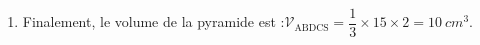 \documentclass[10pt]{article}
\providecommand{\np}[2][]{{#2~#1}}
\begin{document}
\begin{enumerate}
\begin{enumerate}
	L'aire du trapèze ABDC est donc :\quad $\mathcal{A}_{\mathrm{ABDC}} = \dfrac{\sqrt{2} + 4\sqrt{2}}{2}\times 3\sqrt{2} =\dfrac{5\sqrt{2}}{2}\times 3\sqrt{2}= \np[cm^2]{15} $
\end{enumerate}
\item Finalement, le volume de la pyramide est :\quad $\mathcal{V}_{\mathrm{ABDCS}} = \dfrac{1}{3} \times 15 \times 2 = \np[cm^3]{10}$.
\end{enumerate}

	\medskip
\end{document}
